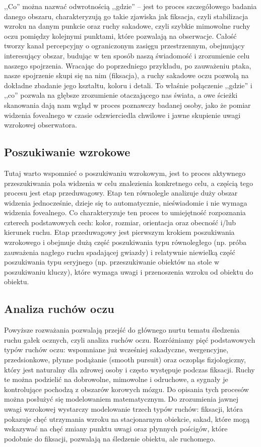 \documentclass[a4paper,twoside,12pt]{book}
\begin{document}
,,Co'' można nazwać odwrotnością ,,gdzie'' -- jest to proces szczegółowego badania danego obszaru, charakteryzują go takie zjawiska jak fiksacja, czyli stabilizacja wzroku na danym punkcie oraz ruchy sakadowe, czyli szybkie mimowolne ruchy oczu pomiędzy kolejnymi punktami, które pozwalają na obserwacje. Całość tworzy kanał percepcyjny o ograniczonym zasięgu przestrzennym, obejmujący interesujący obszar, budując w ten sposób naszą świadomość i zrozumienie celu naszego spojrzenia. Wracając do poprzedniego przykładu, po zauważeniu ptaka, nasze spojrzenie skupi się na nim (fiksacja), a ruchy sakadowe oczu pozwolą na dokładne zbadanie jego kształtu, koloru i detali. To właśnie połączenie ,,gdzie'' i ,,co'' pozwala na głębsze zrozumienie otaczającego nas świata, a owe ścieżki skanowania dają nam 
wgląd w proces poznawczy badanej osoby, jako że pomiar widzenia fovealnego w czasie odzwierciedla chwilowe i jawne skupienie uwagi wzrokowej obserwatora. 

\subsection{Poszukiwanie wzrokowe}
\label{subsec:poszukiwanie-wzrokowe}

Tutaj warto wspomnieć o poszukiwaniu wzrokowym, jest to proces aktywnego przeszukiwania pola widzenia w celu znalezienia konkretnego celu, a częścią tego procesu jest etap przeduwagowy. Etap ten równolegle analizuje duży obszar widzenia jednocześnie, dzieje się to automatycznie, nieświadomie i nie wymaga widzenia fovealnego. Co charakteryzuje ten proces to umiejętność rozpoznania czterech podstawowych cech: kolor, rozmiar, orientacja oraz obecność i/lub kierunek ruchu. Etap przeduwagowy jest pierwszym krokiem poszukiwania wzrokowego i obejmuje dużą część poszukiwania typu równoległego (np. próba zauważenia nagłego ruchu spadającej gwiazdy) i relatywnie niewielką część poszukiwania typu seryjnego (np. przeszukiwanie obiektów na stole w poszukiwaniu kluczy), które wymaga uwagi i przenoszenia wzroku od obiektu do obiektu. 

\subsection{Analiza ruchów oczu}
\label{subsec:analiza-ruchow-oczu}

Powyższe rozważania pozwalają przejść do głównego nurtu tematu śledzenia ruchu gałek ocznych, czyli analiza ruchów oczu. Rozróżniamy pięć podstawowych typów ruchów oczu: wspomniane już wcześniej sakadyczne, wergencyjne, przedsionkowe, płynne podążanie (smooth pursuit) oraz oczopląs fizjologiczny, który jest naturalny dla zdrowej osoby i często występuje podczas fiksacji. Ruchy te można podzielić na dobrowolne, mimowolne i odruchowe, a sygnały je kontrolujące pochodzą z obszarów korowych mózgu. Do opisania tych procesów można posłużyć się modelowaniem matematycznym. Do zrozumienia jawnej uwagi wzrokowej wystarczy modelowanie trzech typów ruchów: fiksacji, która pokazuje chęć utrzymania wzroku na stacjonarnym obiekcie, sakad, które mogą wskazywać na chęć zmiany punktu uwagi oraz płynnych pościgów, które podobnie do fiksacji, pozwalają na śledzenie obiektu, ale ruchomego. 
\end{document}

